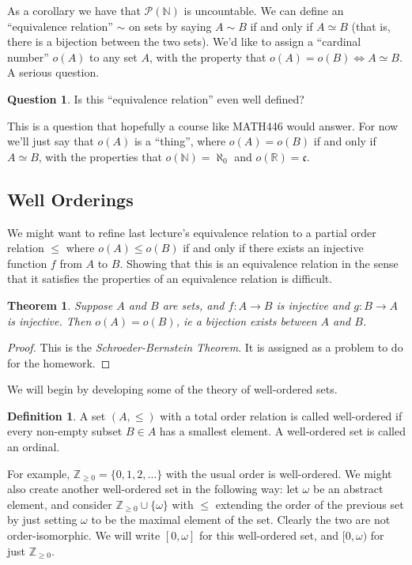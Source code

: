 \documentclass[12pt]{article}
\theoremstyle{plain}
\newtheorem{theorem}{Theorem}
\theoremstyle{definition}
\newtheorem{definition}{Definition}
\newtheorem{question}{Question}
\begin{document}
As a corollary we have that $\mathcal{P}(\mathbb{N})$ is uncountable.
We can define an ``equivalence relation'' $\sim$ on sets by saying $A \sim B$ if and only if $A \simeq B$ (that is, there is a bijection between the two sets). We'd like to assign a ``cardinal number'' $o(A)$ to any set $A$, with the property that $o(A) = o(B) \iff A \simeq B$. A serious question.

\begin{question}
Is this ``equivalence relation'' even well defined? 
\end{question}

This is a question that hopefully a course like MATH446 would answer. For now we'll just say that $o(A)$ is a ``thing'', where $o(A) = o(B)$ if and only if $A \simeq B$, with the properties that $o(\mathbb{N}) = \aleph_0$ and $o(\mathbb{R}) = \mathfrak{c}$. 

\subsection{Well Orderings}

We might want to refine last lecture's equivalence relation to a partial order relation $\leq$ where $o(A) \leq o(B)$ if and only if there exists an injective function $f$ from $A$ to $B$. Showing that this is an equivalence relation in the sense that it satisfies the properties of an equivalence relation is difficult.

\begin{theorem}
Suppose $A$ and $B$ are sets, and $f: A\to B$ is injective and $g: B \to A$ is injective. Then $o(A) = o(B)$, ie a bijection exists between $A$ and $B$.
\end{theorem}
\begin{proof}
This is the \textit{Schroeder-Bernstein Theorem}. It is assigned as a problem to do for the homework.
\end{proof}

We will begin by developing some of the theory of well-ordered sets.

\begin{definition}
	A set $(A, \leq)$ with a total order relation is called well-ordered if every non-empty subset $B \in A$ has a smallest element. A well-ordered set is called an ordinal.
\end{definition}

For example, $\mathbb{Z}_{\geq 0} = \{0, 1, 2, \dots\}$ with the usual order is well-ordered. We might also create another well-ordered set in the following way: let $\omega$ be an abstract element, and consider $\mathbb{Z}_{\geq 0} \cup \{\omega\}$ with $\leq$ extending the order of the previous set by just setting $\omega$ to be the maximal element of the set. Clearly the two are not order-isomorphic. We will write $[0, \omega]$ for this well-ordered set, and $[0, \omega)$ for just $\mathbb{Z}_{\geq 0}$.
\end{document}
